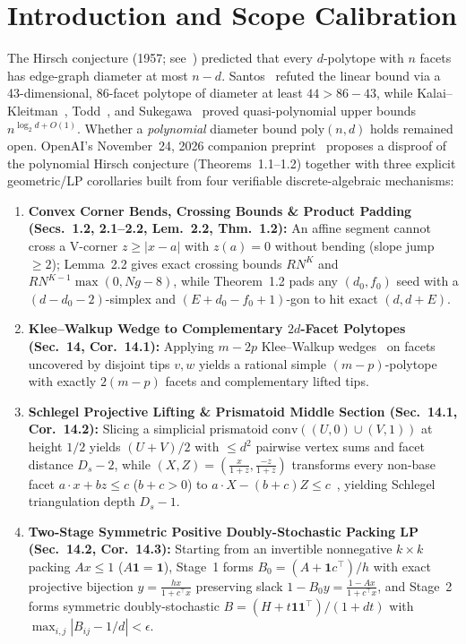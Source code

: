 \documentclass[10pt,twocolumn]{article}
\begin{document}
\section{Introduction and Scope Calibration}\label{sec:intro}
The Hirsch conjecture (1957; see~\cite{dantzig1963linear,klee1967dstep}) predicted that every $d$-polytope with $n$ facets has edge-graph diameter at most $n-d$. Santos~\cite{santos2012counterexample} refuted the linear bound via a 43-dimensional, 86-facet polytope of diameter at least $44 > 86-43$, while Kalai--Kleitman~\cite{kalai1992quasi}, Todd~\cite{todd2014improved}, and Sukegawa~\cite{sukegawa2019asymptotically} proved quasi-polynomial upper bounds $n^{\log_2 d + O(1)}$. Whether a \emph{polynomial} diameter bound $\mathrm{poly}(n,d)$ holds remained open. OpenAI's November~24, 2026 companion preprint~\cite{openai2026hirsch} proposes a disproof of the polynomial Hirsch conjecture (Theorems~1.1--1.2) together with three explicit geometric/LP corollaries built from four verifiable discrete-algebraic mechanisms:
\begin{enumerate}[leftmargin=1.2em,itemsep=1pt,topsep=2pt]
  \item \textbf{Convex Corner Bends, Crossing Bounds \& Product Padding (Secs.~1.2, 2.1--2.2, Lem.~2.2, Thm.~1.2):} An affine segment cannot cross a V-corner $z\ge |x-a|$ with $z(a)=0$ without bending (slope jump $\ge 2$); Lemma~2.2 gives exact crossing bounds $R N^K$ and $R N^{K-1}\max(0, Ng-8)$, while Theorem~1.2 pads any $(d_0,f_0)$ seed with a $(d-d_0-2)$-simplex and $(E+d_0-f_0+1)$-gon to hit exact $(d,d+E)$.
  \item \textbf{Klee--Walkup Wedge to Complementary $2d$-Facet Polytopes (Sec.~14, Cor.~14.1):} Applying $m-2p$ Klee--Walkup wedges~\cite{klee1967dstep} on facets uncovered by disjoint tips $v,w$ yields a rational simple $(m-p)$-polytope with exactly $2(m-p)$ facets and complementary lifted tips.
  \item \textbf{Schlegel Projective Lifting \& Prismatoid Middle Section (Sec.~14.1, Cor.~14.2):} Slicing a simplicial prismatoid $\mathrm{conv}((U,0)\cup(V,1))$ at height $1/2$ yields $(U+V)/2$ with $\le d^2$ pairwise vertex sums and facet distance $D_s - 2$, while $(X,Z)=(\frac{x}{1+z},\frac{-z}{1+z})$ transforms every non-base facet $a\cdot x + b z\le c$ ($b+c>0$) to $a\cdot X - (b+c)Z \le c$~\cite{ziegler1995lectures}, yielding Schlegel triangulation depth $D_s-1$.
  \item \textbf{Two-Stage Symmetric Positive Doubly-Stochastic Packing LP (Sec.~14.2, Cor.~14.3):} Starting from an invertible nonnegative $k\times k$ packing $Ax\le 1$ ($A\mathbf{1}=\mathbf{1}$), Stage~1 forms $B_0=(A+\mathbf{1}c^\top)/h$ with exact projective bijection $y=\frac{hx}{1+c^\top x}$ preserving slack $1-B_0y=\frac{1-Ax}{1+c^\top x}$, and Stage~2 forms symmetric doubly-stochastic $B=(H+t\mathbf{1}\mathbf{1}^\top)/(1+dt)$ with $\max_{i,j}|B_{ij}-1/d|<\epsilon$.
\end{enumerate}
\end{document}

